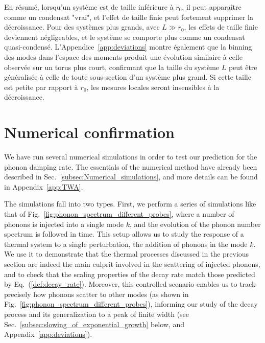 \documentclass[aps,prd,notitlepage,amsfonts,amssymb,amsmath,nofootinbib,superscriptaddress,longbibliography]{revtex4-2}
\begin{document}
{En résumé, lorsqu'un système est de taille inférieure à $r_{0}$, il peut apparaître comme un condensat "vrai", et l'effet de taille finie peut fortement supprimer la décroissance. Pour des systèmes plus grands, avec $L \gg r_{0}$, les effets de taille finie deviennent négligeables, et le système se comporte plus comme un condensat quasi-condensé.
L'Appendice~\ref{app:deviations} montre également que la binning des modes dans l'espace des moments produit une évolution similaire à celle observée sur un torus plus court, confirmant que la taille du système $L$ peut être généralisée à celle de toute sous-section d'un système plus grand. Si cette taille est petite par rapport à $r_{0}$, les mesures locales seront insensibles à la décroissance.
}



\section{Numerical confirmation}
\label{sec:numerical_confirmation}

We have run several numerical simulations in order to test our prediction for the phonon damping rate.  The essentials of the numerical method have already been described in Sec.~\ref{subsec:Numerical_simulations}, and more details can be found in Appendix~\ref{app:TWA}.

The simulations fall into two types.  First, we perform a series of simulations like that of Fig.~\ref{fig:phonon_spectrum_different_probes}, where a number of phonons is injected into a single mode $k$, and the evolution of the phonon number spectrum is followed in time.  This setup allows us to study the response of a thermal system to a single perturbation, the addition of phonons in the mode $k$. We use it to demonstrate that the thermal processes discussed in the previous section are indeed the main culprit involved in the scattering of injected phonons, and to check that the scaling properties of the decay rate match those predicted by Eq.~(\ref{def:decay_rate}). Moreover, this controlled scenario enables us to track precisely how phonons scatter to other modes (as shown in Fig.~\ref{fig:phonon_spectrum_different_probes}), informing our study of the decay process and its generalization to a peak of finite width (see Sec.~\ref{subsec:slowing_of_exponential_growth} below, and Appendix~\ref{app:deviations}).
\end{document}
